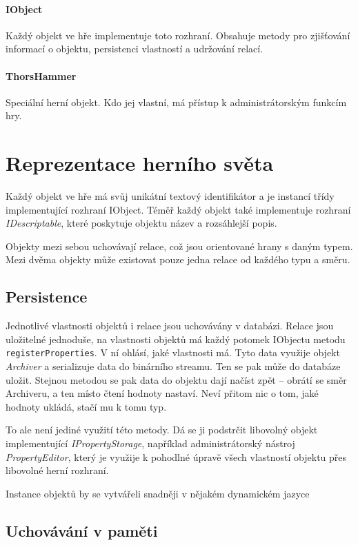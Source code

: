 \documentclass[11pt, a4paper]{article}
\def\class#1{\emph{#1}}
\begin{document}
\paragraph{IObject} Každý objekt ve hře implementuje toto rozhraní. Obsahuje metody pro zjišťování informací o objektu, persistenci vlastností a udržování relací.

\paragraph{ThorsHammer} Speciální herní objekt. Kdo jej vlastní, má přístup k administrátorským funkcím hry.

\section{Reprezentace herního světa}

Každý objekt ve hře má svůj unikátní textový identifikátor a je instancí třídy implementující rozhraní IObject. Téměř každý objekt také implementuje rozhraní \class{IDescriptable}, které poskytuje objektu název a rozsáhlejší popis. 

Objekty mezi sebou uchovávají relace, což jsou orientované hrany s daným typem. Mezi dvěma objekty může existovat pouze jedna relace od každého typu a směru.

\subsection{Persistence}

Jednotlivé vlastnosti objektů i relace jsou uchovávány v databázi. Relace jsou uložitelné jednoduše, na vlastnosti objektů má každý potomek IObjectu metodu \texttt{registerProperties}. V ní ohlásí, jaké vlastnosti má. Tyto data využije objekt \class{Archiver} a serializuje data do binárního streamu. Ten se pak může do databáze uložit. Stejnou metodou se pak data do objektu dají načíst zpět -- obrátí se směr Archiveru, a ten místo čtení hodnoty nastaví. Neví přitom nic o tom, jaké hodnoty ukládá, stačí mu k tomu typ.

To ale není jediné využití této metody. Dá se ji podstrčit libovolný objekt implementující \class{IPropertyStorage}, například administrátorský nástroj \class{PropertyEditor}, který je využije k pohodlné úpravě všech vlastností objektu přes libovolné herní rozhraní.

Instance objektů by se vytvářeli snadněji v nějakém dynamickém jazyce

\subsection{Uchovávání v paměti}
\end{document}
